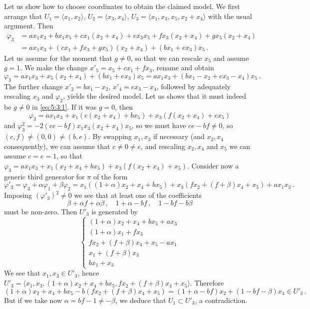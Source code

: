 \documentclass[10pt,reqno]{amsart}
\newcommand{\la}{\langle}
\newcommand{\ra}{\rangle}
\renewcommand{\a}{\alpha}
\renewcommand{\b}{\beta}
\newcommand{\f}{\varphi}
\theoremstyle{definition}
\begin{document}
\noindent Let us show how to choose coordinates to obtain the claimed model. We first arrange that $U_1=\la x_1, x_2 \ra$, $U_2=\la x_3, x_4 \ra$, $U_3=\la x_1, x_3, x_5, x_2+x_4 \ra$ with the usual argument. Then
\begin{align}\label{eq:5:3:1}
\f_3&=ax_1x_3+bx_1x_5+cx_1(x_2+x_4)+ex_3x_5+fx_3(x_2+x_4)+gx_5(x_2+x_4)\nonumber\\
&=ax_1x_3+(cx_1+fx_3+gx_5)(x_2+x_4)+(bx_1+ex_3)x_5\,.
\end{align}
Let us assume for the moment that $g \ne 0$, so that we can rescale $x_5$ and assume $g=1$. We make the change $x'_5=x_5+cx_1+fx_3$, rename and obtain
\[
\f_3=ax_1x_3+x_5(x_2+x_4)+(bx_1+ex_3)x_5=ax_1x_3+(bx_1-x_2+ex_3-x_4)x_5\,.
\]
The further change $x'_2=bx_1-x_2$, $x'_4=ex_3-x_4$, followed by adequately rescaling $x_3$ and $\f_2$, yields the desired model. Let us shows that it must indeed be $g \ne 0$ in \eqref{eq:5:3:1}. If it was $g=0$, then
\[
\f_3=ax_1x_3+x_1(c(x_2+x_4)+bx_5)+x_3(f(x_2+x_4)+ex_5)
\]
and $\f_3^2=-2(ce-bf)x_1x_3(x_2+x_4)x_5$, so we must have $ce-bf \ne 0$, so $(c,f) \ne (0,0) \ne (b,e)$. By swapping $x_1, x_3$ if necessary (and $x_2,x_4$ consequently), we can assume that $c \ne 0 \ne e$, and rescaling $x_2,x_4$ and $x_5$ we can assume $c=e=1$, so that $\f_3=ax_1x_3+x_1(x_2+x_4+bx_5)+x_3(f(x_2+x_4)+x_5)$. Consider now a generic third generator for $\pi$ of the form
\[
\f'_3=\f_3 + \a \f_1+\b\f_2 =x_1((1+\a)x_2+x_4+bx_5)+x_3(fx_2+(f+\b)x_4+x_5)+ax_1x_3\,.
\]
Imposing $(\f'_3)^2\neq 0$ we see that at least one of the coefficients 
\[
\b+\a f+\a\b\,, \quad 1+\a-bf\,, \quad 1-bf-b\b
\]
must be non-zero. Then $U'_3$ is generated by
\[
\begin{cases}
    (1+\a)x_2+x_4+bx_5+ax_3 \\
    (1+\a)x_1+fx_3 \\
    fx_2+(f+\b)x_4+x_5-ax_1\\
    x_1+(f+\b)x_3 \\
    bx_1+x_3
\end{cases}
\]
We see that $x_1,x_3 \in U'_3$, hence $U'_3=\la x_1,x_3,(1+\a)x_2+x_4+bx_5,fx_2+(f+\b)x_4+x_5\ra$. Therefore
\[
(1+\a)x_2+x_4+bx_5-b(fx_2+(f+\b)x_4+x_5)= (1+\a-bf)x_2+(1-bf-\b)x_4 \in U'_3\, .
\]
But if we take now $\a=bf-1 \ne -\b$, we deduce that $U_1\subset U'_3$, a contradiction.
\end{document}
